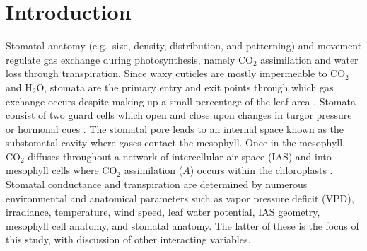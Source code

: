 \documentclass[webpdf,large,modern,unnumsec,namedate]{oup-authoring-template}
\begin{document}
\section{Introduction}\label{introduction}

Stomatal anatomy (e.g.~size, density, distribution, and patterning) and
movement regulate gas exchange during photosynthesis, namely CO\(_2\)
assimilation and water loss through transpiration. Since waxy cuticles
are mostly impermeable to CO\(_2\) and H\(_2\)O, stomata are the primary
entry and exit points through which gas exchange occurs despite making
up a small percentage of the leaf area \citep{lange_responses_1971}.
Stomata consist of two guard cells which open and close upon changes in
turgor pressure or hormonal cues \citep{mcadam_linking_2016}. The
stomatal pore leads to an internal space known as the substomatal cavity
where gases contact the mesophyll. Once in the mesophyll, CO\(_2\)
diffuses throughout a network of intercellular air space (IAS) and into
mesophyll cells where CO\(_2\) assimilation (\(A\)) occurs within the
chloroplasts \citep{lee_diffusion_1964}. Stomatal conductance and
transpiration are determined by numerous environmental and anatomical
parameters such as vapor pressure deficit (VPD), irradiance,
temperature, wind speed, leaf water potential, IAS geometry, mesophyll
cell anatomy, and stomatal anatomy. The latter of these is the focus of
this study, with discussion of other interacting variables.
\end{document}
